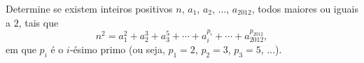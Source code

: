 Determine se existem inteiros positivos $n$, $a_1$, $a_2$, $\dots$, $a_{2012}$, todos maiores ou iguais a $2$, tais que
$$ n^2 = a_1^2 + a_2^3 + a_3^5 + \cdots + a_i^{p_i} + \cdots + a_{2012}^{p_{2012}}, $$
em que $p_i$ é o $i$-ésimo primo (ou seja, $p_1 = 2$, $p_2 = 3$, $p_3 = 5$, $\dots$).
